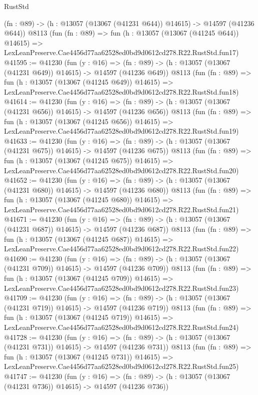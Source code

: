 \begin{lexlean}{RustStd}
\begin{coremodule}
    (fn : @89) -> (h : @13057 (@13067 (@41231 @644)) @14615) -> @14597 (@41236 @644))
    @8113
    (fun (fn : @89) =>
    fun (h : @13057 (@13067 (@41245 @644)) @14615) =>
    LexLeanPreserve.Cae4456d77aa62528ed0bd9d0612cd278.R22.RustStd.fun17)
@41595 := @41230
    (fun (y : @16) =>
    (fn : @89) -> (h : @13057 (@13067 (@41231 @649)) @14615) -> @14597 (@41236 @649))
    @8113
    (fun (fn : @89) =>
    fun (h : @13057 (@13067 (@41245 @649)) @14615) =>
    LexLeanPreserve.Cae4456d77aa62528ed0bd9d0612cd278.R22.RustStd.fun18)
@41614 := @41230
    (fun (y : @16) =>
    (fn : @89) -> (h : @13057 (@13067 (@41231 @656)) @14615) -> @14597 (@41236 @656))
    @8113
    (fun (fn : @89) =>
    fun (h : @13057 (@13067 (@41245 @656)) @14615) =>
    LexLeanPreserve.Cae4456d77aa62528ed0bd9d0612cd278.R22.RustStd.fun19)
@41633 := @41230
    (fun (y : @16) =>
    (fn : @89) -> (h : @13057 (@13067 (@41231 @675)) @14615) -> @14597 (@41236 @675))
    @8113
    (fun (fn : @89) =>
    fun (h : @13057 (@13067 (@41245 @675)) @14615) =>
    LexLeanPreserve.Cae4456d77aa62528ed0bd9d0612cd278.R22.RustStd.fun20)
@41652 := @41230
    (fun (y : @16) =>
    (fn : @89) -> (h : @13057 (@13067 (@41231 @680)) @14615) -> @14597 (@41236 @680))
    @8113
    (fun (fn : @89) =>
    fun (h : @13057 (@13067 (@41245 @680)) @14615) =>
    LexLeanPreserve.Cae4456d77aa62528ed0bd9d0612cd278.R22.RustStd.fun21)
@41671 := @41230
    (fun (y : @16) =>
    (fn : @89) -> (h : @13057 (@13067 (@41231 @687)) @14615) -> @14597 (@41236 @687))
    @8113
    (fun (fn : @89) =>
    fun (h : @13057 (@13067 (@41245 @687)) @14615) =>
    LexLeanPreserve.Cae4456d77aa62528ed0bd9d0612cd278.R22.RustStd.fun22)
@41690 := @41230
    (fun (y : @16) =>
    (fn : @89) -> (h : @13057 (@13067 (@41231 @709)) @14615) -> @14597 (@41236 @709))
    @8113
    (fun (fn : @89) =>
    fun (h : @13057 (@13067 (@41245 @709)) @14615) =>
    LexLeanPreserve.Cae4456d77aa62528ed0bd9d0612cd278.R22.RustStd.fun23)
@41709 := @41230
    (fun (y : @16) =>
    (fn : @89) -> (h : @13057 (@13067 (@41231 @719)) @14615) -> @14597 (@41236 @719))
    @8113
    (fun (fn : @89) =>
    fun (h : @13057 (@13067 (@41245 @719)) @14615) =>
    LexLeanPreserve.Cae4456d77aa62528ed0bd9d0612cd278.R22.RustStd.fun24)
@41728 := @41230
    (fun (y : @16) =>
    (fn : @89) -> (h : @13057 (@13067 (@41231 @731)) @14615) -> @14597 (@41236 @731))
    @8113
    (fun (fn : @89) =>
    fun (h : @13057 (@13067 (@41245 @731)) @14615) =>
    LexLeanPreserve.Cae4456d77aa62528ed0bd9d0612cd278.R22.RustStd.fun25)
@41747 := @41230
    (fun (y : @16) =>
    (fn : @89) -> (h : @13057 (@13067 (@41231 @736)) @14615) -> @14597 (@41236 @736))

\end{coremodule}
\end{lexlean}
